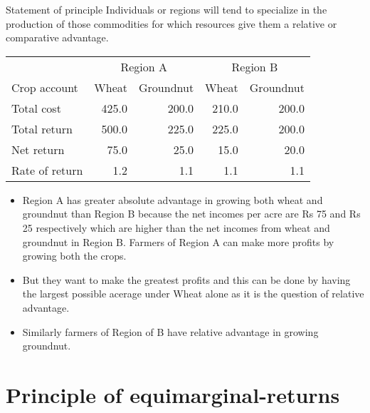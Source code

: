 \documentclass[12pt,ignorenonframetext,aspectratio=169]{beamer}
\providecommand{\tightlist}{%
  \setlength{\itemsep}{0pt}\setlength{\parskip}{0pt}}
\begin{document}
\begin{frame}{Statement of principle}
\protect\hypertarget{statement-of-principle}{}
Individuals or regions will tend to specialize in the production of
those commodities for which resources give them a relative or
comparative advantage.

\begin{tabular}{lrrrr}
\toprule
\multicolumn{1}{c}{ } & \multicolumn{2}{c}{Region A} & \multicolumn{2}{c}{Region B} \\
\cmidrule(l{3pt}r{3pt}){2-3} \cmidrule(l{3pt}r{3pt}){4-5}
Crop account & Wheat & Groundnut & Wheat & Groundnut\\
\midrule
Total cost & 425.0 & 200.0 & 210.0 & 200.0\\
Total return & 500.0 & 225.0 & 225.0 & 200.0\\
Net return & 75.0 & 25.0 & 15.0 & 20.0\\
Rate of return & 1.2 & 1.1 & 1.1 & 1.1\\
\bottomrule
\end{tabular}
\end{frame}

\begin{frame}{}
\protect\hypertarget{section-7}{}
\begin{itemize}
\tightlist
\item
  Region A has greater absolute advantage in growing both wheat and
  groundnut than Region B because the net incomes per acre are Rs 75 and
  Rs 25 respectively which are higher than the net incomes from wheat
  and groundnut in Region B. Farmers of Region A can make more profits
  by growing both the crops.
\item
  But they want to make the greatest profits and this can be done by
  having the largest possible acerage under Wheat alone as it is the
  question of relative advantage.
\item
  Similarly farmers of Region of B have relative advantage in growing
  groundnut.
\end{itemize}
\end{frame}

\hypertarget{principle-of-equimarginal-returns}{%
\section{Principle of
equimarginal-returns}\label{principle-of-equimarginal-returns}}
\end{document}
